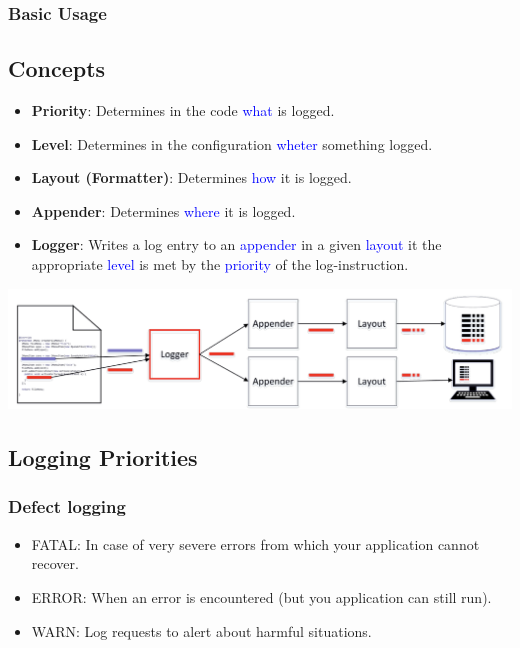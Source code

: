 \documentclass[10pt]{article}
\begin{document}
    \subsubsection{Basic Usage}
	
	
	\subsection{Concepts}
	\begin{itemize}
		\item \textbf{Priority}: Determines in the code \textcolor{blue}{what} is logged.
		\item \textbf{Level}: Determines in the configuration \textcolor{blue}{wheter} something logged.
		\item \textbf{Layout (Formatter)}: Determines \textcolor{blue}{how} it is logged.
		\item \textbf{Appender}: Determines \textcolor{blue}{where} it is logged.
		\item \textbf{Logger}: Writes a log entry to an \textcolor{blue}{appender} in a given \textcolor{blue}{layout} it the appropriate \textcolor{blue}{level} is met by the \textcolor{blue}{priority} of the log-instruction.
	\end{itemize}
	\begin{center}
		\includegraphics[scale=0.5]{assets/logger_flow}
	\end{center}
	
	\subsection{Logging Priorities}
	\subsubsection{Defect logging}
	\begin{itemize}
		\item FATAL: In case of very severe errors from which your application cannot recover.
		\item ERROR: When an error is encountered (but you application can still run).
		\item WARN: Log requests to alert about harmful situations. 
	\end{itemize}
	
\end{document}
